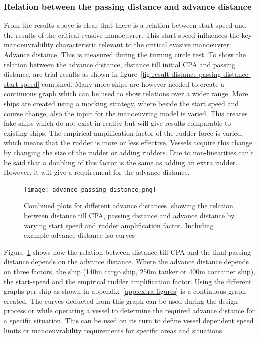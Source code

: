 \subsubsection{Relation between the passing distance and advance distance}
\label{sec:relation-advance-distance}
From the results above is clear that there is a relation between start speed and the results of the critical evasive manoeuvrer. This start speed influences the key manoeuvrability characteristic relevant to the critical evasive manoeuvrer: Advance distance. This is measured during the turning circle test. To show the relation between the advance distance, distance till initial CPA and passing distance, are trial results as shown in figure~\ref{fig:result-distance-passing-distance-start-speed} combined. Many more ships are however needed to create a continuous graph which can be used to show relations over a wider range. More ships are created using a mocking strategy, where beside the start speed and course change, also the input for the manoeuvring model is varied. This creates fake ships which do not exist in reality but will give results comparable to existing ships. The empirical amplification factor of the rudder force is varied, which means that the rudder is more or less effective. Vessels acquire this change by changing the size of the rudder or adding rudders. Due to non-linearities can't be said that a doubling of this factor is the same as adding an extra rudder. However, it will give a requirement for the advance distance. 

\begin{figure}[p]
	\centering
	\texttt{[image: advance-passing-distance.png]}
	\caption{Combined plots for different advance distances, showing the relation between distance till CPA, passing distance and advance distance by varying start speed and rudder amplification factor. Including example advance distance iso-curves}
	\label{fig:passing-distance-advance}
\end{figure}

Figure~\ref{fig:passing-distance-advance} shows how the relation between distance till CPA and the final passing distance depends on the advance distance. Where the advance distance depends on three factors, the ship (140m cargo ship, 250m tanker or 400m container ship), the start-speed and the empirical rudder amplification factor. Using the different graphs per ship as shown in appendix~\ref{app:extra-figures} is a continuous graph created. The curves deducted from this graph can be used during the design process or while operating a vessel to determine the required advance distance for a specific situation. This can be used on its turn to define vessel dependent speed limits or manoeuvrability requirements for specific areas and situations.

